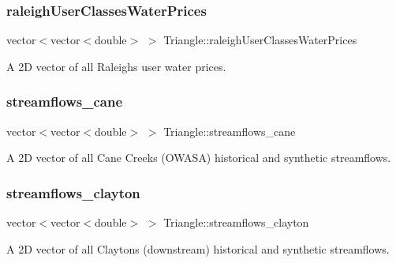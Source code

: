 \subsubsection{\texorpdfstring{raleigh\+User\+Classes\+Water\+Prices}{raleighUserClassesWaterPrices}}
{\footnotesize\ttfamily vector$<$vector$<$double$>$ $>$ Triangle\+::raleigh\+User\+Classes\+Water\+Prices\hspace{0.3cm}{\ttfamily [private]}}



A 2D vector of all Raleigh\textquotesingle{}s user water prices. 

\mbox{\label{classTriangle_a0a20ad805c77f2af96433b17eb3cc733}} 
\subsubsection{\texorpdfstring{streamflows\+\_\+cane}{streamflows\_cane}}
{\footnotesize\ttfamily vector$<$vector$<$double$>$ $>$ Triangle\+::streamflows\+\_\+cane\hspace{0.3cm}{\ttfamily [private]}}



A 2D vector of all Cane Creek\textquotesingle{}s (O\+W\+A\+SA) historical and synthetic streamflows. 

\mbox{\label{classTriangle_a2c59e6b06ce2824ac697ca97c2423060}} 
\subsubsection{\texorpdfstring{streamflows\+\_\+clayton}{streamflows\_clayton}}
{\footnotesize\ttfamily vector$<$vector$<$double$>$ $>$ Triangle\+::streamflows\+\_\+clayton\hspace{0.3cm}{\ttfamily [private]}}



A 2D vector of all Clayton\textquotesingle{}s (downstream) historical and synthetic streamflows. 

\mbox{\label{classTriangle_a8c97075d74abc5e38084934fb213fe2a}} 
